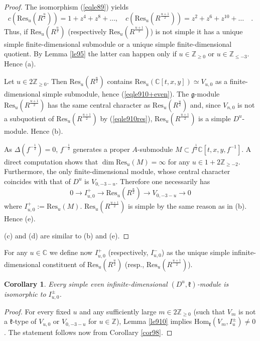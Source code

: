 \documentclass[12pt]{amsart}
\theoremstyle{plain} %
\newtheorem{corollary}[definition]{Corollary}
\renewcommand{\hom}{\mathrm{Hom}}
\newcommand{\res}{\mathrm{Res}}
\newcommand {\ZZ} {\mathbb {Z}}
\newcommand {\CC} {\mathbb {C}}
\newcommand{\kk}{\mathfrak{k}}
\renewcommand{\gg}{\mathfrak{g}}
\newcommand{\half}{\frac{1}{2}}
\newcommand{\refle}[1]{Lemma \ref{#1}}
\newcommand{\refcor}[1]{Corollary \ref{#1}}
\newcommand{\refeq}[1]{(\ref{#1})}
\begin{document}
\begin{proof}
The isomorphism \refeq{eqle89} yields
\begin{equation}\label{eqle910res}
c(\res_u (R^{\frac{u}{2}}))=1+z^4+z^8+\dots,\quad c(\res_u (R^{\frac{u+1}{2}}))=z^2+z^6+z^{10}+\dots\quad.
\end{equation}
Thus, if $\res_u(R^{\frac{u}{2}})$ (respectively $\res_u(R^{\frac{u+1}{2}})$) is not simple it has a unique simple finite-dimensional submodule or a unique simple finite-dimensional quotient. By \refle{le95} the latter can happen only if $u\in \ZZ_{\geq 0}$ or $u\in \ZZ_{\leq-3}$. Hence (a).

Let $u\in 2\ZZ_{\geq 0}$. Then $\res_u(R^{\frac{u}{2}})$ contains $\res_u(\CC[t,x,y])\simeq V_{u,0}$ as a finite-dimensional simple submodule, hence \refeq{eqle910+even}. The $\gg$-module $\res_u(R^{\frac{u+1}{2}})$ has the same central character as $\res_u(R^{\frac{u}{2}})$ and, since $V_{n,0}$ is not a subquotient of $\res_u(R^{\frac{u+1}{2}})$ by \refeq{eqle910res}, $\res_u(R^{\frac{u+1}{2}})$ is a simple $D^u$-module. Hence (b).

As $\Delta(f^{-\half})=0$, $f^{-\half}$ generates a proper $A$-submodule $M\subset f^{\half}\CC[t,x,y,f^{-1}]$. A direct computation shows that $\dim\res_u(M)=\infty$ for any $u\in1+2\ZZ_{\geq -2}$. Furthermore, the only finite-dimensional module, whose central character coincides with that of $D^u$ is $V_{0,-3-u}$. Therefore one necessarily has
\[
0\to I_{u,0}^+\to\res_u(R^{\frac{u}{2}})\to V_{0,-3-u}\to 0
\]
where $I^+_{u,0}:=\res_u(M)$. $\res_u(R^{\frac{u+1}{2}})$ is simple by the same reason as in (b). Hence (e).

(c) and (d) are similar to (b) and (e).
\end{proof}

For any $u\in\CC$ we define now $I^+_{u,0}$ (respectively, $I^-_{u,0}$) as the unique simple infinite-dimensional constituent of $\res_u(R^{\frac{u}{2}})$ (resp., $\res_u(R^{\frac{u+1}{2}})$).

\begin{corollary}\label{cor103sl}
Every simple even infinite-dimensional $(D^u,\kk)$-module is isomorphic to $I^\pm_{u,0}$.
\end{corollary}
\begin{proof}
For every fixed $u$ and any sufficiently large $m\in 2\ZZ_{\geq 0}$ (such that $V_m$ is not a $\kk$-type of $V_{u,0}$ or $V_{0,-3-u}$ for $u\in\ZZ$), \refle{le910} implies $\hom_\kk(V_m,I^\pm_u)\neq 0$. The statement follows now from \refcor{cor98}.
\end{proof}
\end{document}
